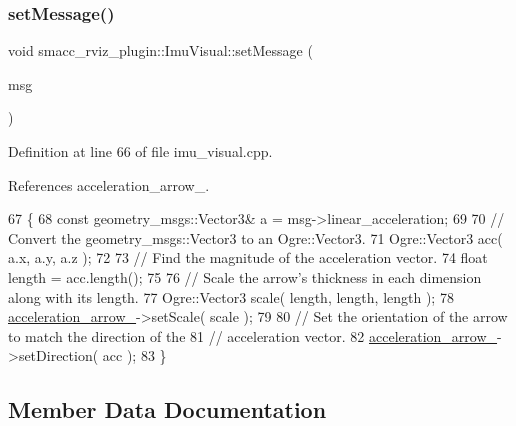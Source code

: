 \subsubsection{\texorpdfstring{set\+Message()}{setMessage()}}
{\footnotesize\ttfamily void smacc\+\_\+rviz\+\_\+plugin\+::\+Imu\+Visual\+::set\+Message (\begin{DoxyParamCaption}\item[{const sensor\+\_\+msgs\+::\+Imu\+::\+Const\+Ptr \&}]{msg }\end{DoxyParamCaption})}



Definition at line 66 of file imu\+\_\+visual.\+cpp.



References acceleration\+\_\+arrow\+\_\+.


\begin{DoxyCode}
67 \{
68   \textcolor{keyword}{const} geometry\_msgs::Vector3& a = msg->linear\_acceleration;
69 
70   \textcolor{comment}{// Convert the geometry\_msgs::Vector3 to an Ogre::Vector3.}
71   Ogre::Vector3 acc( a.x, a.y, a.z );
72 
73   \textcolor{comment}{// Find the magnitude of the acceleration vector.}
74   \textcolor{keywordtype}{float} length = acc.length();
75 
76   \textcolor{comment}{// Scale the arrow's thickness in each dimension along with its length.}
77   Ogre::Vector3 scale( length, length, length );
78   \hyperlink{classsmacc__rviz__plugin_1_1ImuVisual_abead7d3f3c66b20bba8123a145b121b0}{acceleration\_arrow\_}->setScale( scale );
79 
80   \textcolor{comment}{// Set the orientation of the arrow to match the direction of the}
81   \textcolor{comment}{// acceleration vector.}
82   \hyperlink{classsmacc__rviz__plugin_1_1ImuVisual_abead7d3f3c66b20bba8123a145b121b0}{acceleration\_arrow\_}->setDirection( acc );
83 \}
\end{DoxyCode}


\subsection{Member Data Documentation}
\mbox{\label{classsmacc__rviz__plugin_1_1ImuVisual_abead7d3f3c66b20bba8123a145b121b0}} 

